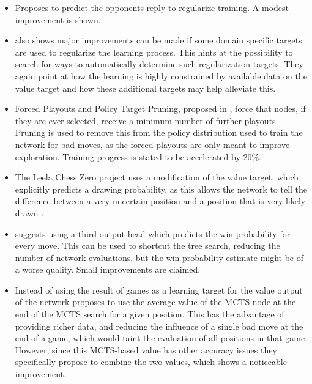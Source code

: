 \documentclass[12pt,onecolumn,oneside,titlepage]{article}
\begin{document}
\begin{itemize}
 \item \cite{wu2019accelerating} Proposes to predict the opponents reply to regularize training. A modest improvement is shown.
 \item \cite{wu2019accelerating} also shows major improvements can be made if some domain specific targets are used to regularize the learning process. This hints at the possibility to search for ways to automatically determine such regularization targets.
 They again point at how the learning is highly constrained by available data on the value target and how these additional targets may help alleviate this.
 \item Forced Playouts and Policy Target Pruning, proposed in \cite{wu2019accelerating}, force that nodes, if they are ever selected, receive a minimum number of further playouts. Pruning is used to remove this from the policy distribution used to train the network for bad moves,
 as the forced playouts are only meant to improve exploration. Training progress is stated to be accelerated by 20\%.
 \item The Leela Chess Zero project uses a modification of the value target, which explicitly predicts a drawing probability, as this allows the network to tell the difference between a very uncertain position and a position that is very likely drawn \cite{leela0wdl}.
 \item \cite{anonymous2020threehead} suggests using a third output head which predicts the win probability for every move. This can be used to shortcut the tree search, reducing the number of network evaluations, but the win probability estimate might be of a worse quality.
  Small improvements are claimed.
 \item Instead of using the result of games as a learning target for the value output of the network \cite{oracledevs6} proposes to use the average value of the MCTS node at the end of the MCTS search for a given position. This has the advantage of providing richer data,
 and reducing the influence of a single bad move at the end of a game, which would taint the evaluation of all positions in that game. However, since this MCTS-based value has other accuracy issues they specifically propose to combine the two values, which shows a noticeable improvement.
\end{itemize}
\end{document}
